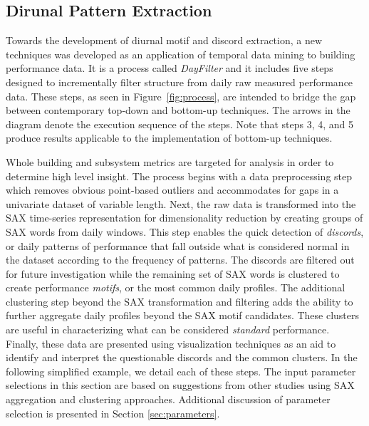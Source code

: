 \subsection{Dirunal Pattern Extraction}
\label{sec:dayfilter}

Towards the development of diurnal motif and discord extraction, a new techniques was developed as an application of temporal data mining to building performance data. It is a process called \emph{DayFilter} and it includes five steps designed to incrementally filter structure from daily raw measured performance data. These steps, as seen in Figure~\ref{fig:process}, are intended to bridge the gap between contemporary top-down and bottom-up techniques. The arrows in the diagram denote the execution sequence of the steps. Note that steps 3, 4, and 5 produce results applicable to the implementation of bottom-up techniques.  

Whole building and subsystem metrics are targeted for analysis in order to determine high level insight. The process begins with a data preprocessing step which removes obvious point-based outliers and accommodates for gaps in a univariate dataset of variable length. Next, the raw data is transformed into the SAX time-series representation for dimensionality reduction by creating groups of SAX words from daily windows. This step enables the quick detection of \emph{discords}, or daily patterns of performance that fall outside what is considered normal in the dataset according to the frequency of patterns. The discords are filtered out for future investigation while the remaining set of SAX words is clustered to create performance \emph{motifs}, or the most common daily profiles. The additional clustering step beyond the SAX transformation and filtering adds the ability to further aggregate daily profiles beyond the SAX motif candidates. These clusters are useful in characterizing what can be considered \emph{standard} performance. Finally, these data are presented using visualization techniques as an aid to identify and interpret the questionable discords and the common clusters. In the following simplified example, we detail each of these steps. The input parameter selections in this section are based on suggestions from other studies using SAX aggregation and clustering approaches. Additional discussion of parameter selection is presented in Section \ref{sec:parameters}.